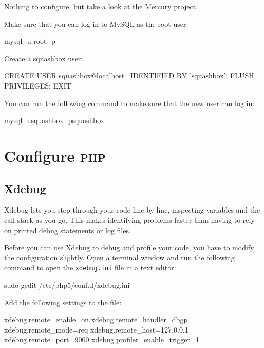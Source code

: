 \documentclass[draft,ebook,10pt,twoside,openright]{memoir}
\begin{document}
Nothing to configure, but take a look at the Mercury project.

Make sure that you can log in to MySQL as the root user:

\begin{squashboxcommand}
mysql -u root -p
\end{squashboxcommand}

Create a squashbox user:

\begin{squashboxcommand}
CREATE USER squashbox@localhost \
  IDENTIFIED BY 'squashbox';
FLUSH PRIVILEGES;
EXIT
\end{squashboxcommand}

You can run the following command to make sure that the new user can log in:

\begin{squashboxcommand}
mysql -usquashbox -psquashbox
\end{squashboxcommand}

\section{Configure \textsc{php}}

\subsection{Xdebug}

Xdebug lets you step through your code line by line, inspecting variables and the call stack as you go. This makes identifying problems faster than having to rely on printed debug statements or log files.

Before you can use Xdebug to debug and profile your code, you have to modify the configuration slightly. Open a terminal window and run the following command to open the \verb!xdebug.ini! file in a text editor:

\begin{squashboxcommand}
sudo gedit /etc/php5/conf.d/xdebug.ini
\end{squashboxcommand}

Add the following settings to the file:

\begin{squashboxoutput}
xdebug.remote_enable=on
xdebug.remote_handler=dbgp
xdebug.remote_mode=req
xdebug.remote_host=127.0.0.1
xdebug.remote_port=9000
xdebug.profiler_enable_trigger=1
\end{squashboxoutput}
\end{document}
